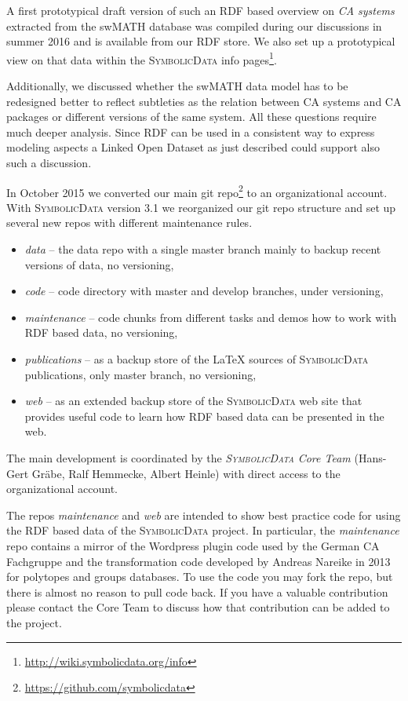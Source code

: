 \documentclass[a4paper,11pt]{article}
\def\SD{\textsc{Symbolic\-Data}}
\begin{document}
\begin{multicols}{2}
A first prototypical draft version of such an RDF based overview on \emph{CA
  systems} extracted from the swMATH database was compiled during our
discussions in summer 2016 and is available from our RDF store.  We also set up
a prototypical view on that data within the {\SD} info pages\footnote{
  \url{http://wiki.symbolicdata.org/info}}.

Additionally, we discussed whether the swMATH data model has to be redesigned
better to reflect subtleties as the relation between CA systems and CA
packages or different versions of the same system.  All these questions
require much deeper analysis.  Since RDF can be used in a consistent way to
express modeling aspects a Linked Open Dataset as just described could support
also such a discussion.

\Ueberschrift{Advances in the {\SD} Infrastructure}{ai}

In October 2015 we converted our main git repo\footnote{
  \url{https://github.com/symbolicdata}} to an organizational account. With
{\SD} version 3.1 we reorganized our git repo structure and set up several new
repos with different maintenance rules.
\begin{itemize}
\item \emph{data} -- the data repo with a single master branch mainly to backup
  recent versions of data, no versioning,
\item \emph{code} -- code directory with master and develop branches, under
  versioning,
\item \emph{maintenance} -- code chunks from different tasks and demos how to
  work with RDF based data, no versioning,
\item \emph{publications} -- as a backup store of the {\LaTeX} sources of {\SD}
  publications, only master branch, no versioning,
\item \emph{web} -- as an extended backup store of the {\SD} web site that
  provides useful code to learn how RDF based data can be presented in the
  web.
\end{itemize}

The main development is coordinated by the \emph{{\SD} Core Team} (Hans-Gert
Gr\"abe, Ralf Hemmecke, Albert Heinle) with direct access to the
organizational account.

The repos \emph{maintenance} and \emph{web} are intended to show best practice
code for using the RDF based data of the {\SD} project.  In particular, the
\emph{maintenance} repo contains a mirror of the Wordpress plugin code used by
the German CA Fachgruppe and the transformation code developed by Andreas
Nareike in 2013 for polytopes and groups databases.  To use the code you may
fork the repo, but there is almost no reason to pull code back. If you have a
valuable contribution please contact the Core Team to discuss how that
contribution can be added to the project.


\end{multicols}
\end{document}
